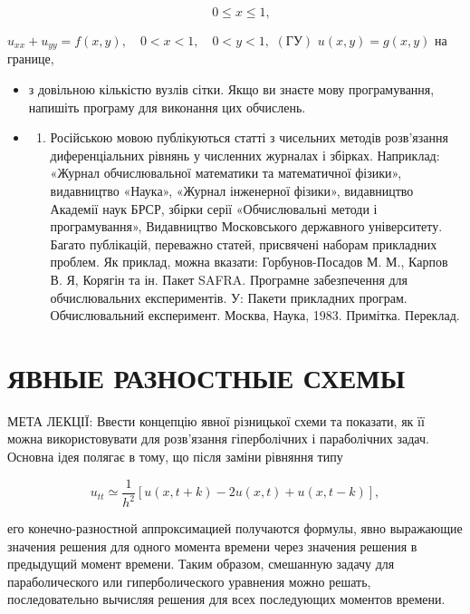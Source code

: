 \documentclass[
  ukrainian,
]{article}
\providecommand{\tightlist}{%
  \setlength{\itemsep}{0pt}\setlength{\parskip}{0pt}}
\begin{document}
\[
\quad 0 \leqslant x \leqslant 1,
\]

\(u_{xx} + u_{yy} = f(x, y), \quad 0 < x < 1, \quad 0 < y < 1,\)
\((\text{ГУ})\) \(u(x, y) = g(x, y)\) на границе,

\begin{itemize}
\tightlist
\item
  з довільною кількістю вузлів сітки. Якщо ви знаєте мову програмування,
  напишіть програму для виконання цих обчислень.
\item
  \begin{enumerate}
  \def\labelenumi{\arabic{enumi})}
  \tightlist
  \item
    Російською мовою публікуються статті з чисельних методів розв'язання
    диференціальних рівнянь у численних журналах і збірках. Наприклад:
    «Журнал обчислювальної математики та математичної фізики»,
    видавництво «Наука», «Журнал інженерної фізики», видавництво
    Академії наук БРСР, збірки серії «Обчислювальні методи і
    програмування», Видавництво Московського державного університету.
    Багато публікацій, переважно статей, присвячені наборам прикладних
    проблем. Як приклад, можна вказати: Горбунов-Посадов М. М., Карпов
    В. Я, Корягін та ін. Пакет SAFRA. Програмне забезпечення для
    обчислювальних експериментів. У: Пакети прикладних програм.
    Обчислювальний експеримент. Москва, Наука, 1983. Примітка. Переклад.
  \end{enumerate}
\end{itemize}

\section{ЯВНЫЕ РАЗНОСТНЫЕ
СХЕМЫ}\label{ux44fux432ux43dux44bux435-ux440ux430ux437ux43dux43eux441ux442ux43dux44bux435-ux441ux445ux435ux43cux44b}

МЕТА ЛЕКЦІЇ: Ввести концепцію явної різницької схеми та показати, як її
можна використовувати для розв'язання гіперболічних і параболічних
задач. Основна ідея полягає в тому, що після заміни рівняння типу

\[
u_{tt} \simeq \frac{1}{h^2} [u(x, t+k) - 2u(x, t) + u(x, t-k)],
\]

его конечно-разностной аппроксимацией получаются формулы, явно
выражающие значения решения для одного момента времени через значения
решения в предыдущий момент времени. Таким образом, смешанную задачу для
параболического или гиперболического уравнения можно решать,
последовательно вычисляя решения для всех последующих моментов времени.
\end{document}
